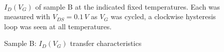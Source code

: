 \begin{figure}
\begin{centering}
{}~~
\par\end{centering}
\begin{centering}
\par\end{centering}
\caption{Sample B: $I_{D}\left(V_{G}\right)$ transfer characteristics\label{fig:Sample-B-loops}}

$I_{D}\left(V_{G}\right)$ of sample B at the indicated fixed temperatures.
Each was measured with $V_{DS}=0.1\,V$ as $V_{G}$ was cycled, a
clockwise hysteresis loop was seen at all temperatures.
\end{figure}

